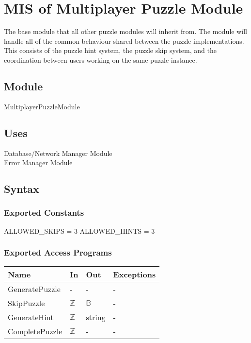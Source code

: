 \documentclass[12pt, titlepage]{article}
\begin{document}
\newpage

\section{MIS of {Multiplayer Puzzle Module}} \label{sec:Puzzle} 

The base module that all other puzzle modules will inherit from. The module will handle all of the common behaviour shared between the puzzle implementations. This consists of the puzzle hint system, the puzzle skip system, and the coordination between users working on the same puzzle instance. 

\subsection{Module}
MultiplayerPuzzleModule

\subsection{Uses}
Database/Network Manager Module\\
Error Manager Module

\subsection{Syntax}

\subsubsection{Exported Constants}
ALLOWED\_SKIPS = 3 \newline
\noindent ALLOWED\_HINTS = 3

\subsubsection{Exported Access Programs}

\begin{center}
\begin{tabular}{p{4cm} p{3cm} p{3cm} p{3cm}}
\hline
\textbf{Name} & \textbf{In} & \textbf{Out} & \textbf{Exceptions} \\
\hline
GeneratePuzzle & - & - & - \\
SkipPuzzle & $\mathds{Z}$ & $\mathds{B}$ & - \\
GenerateHint & $\mathds{Z}$ & string & - \\
CompletePuzzle & $\mathds{Z}$ & - & - \\
\hline
\end{tabular}
\end{center}
\end{document}
